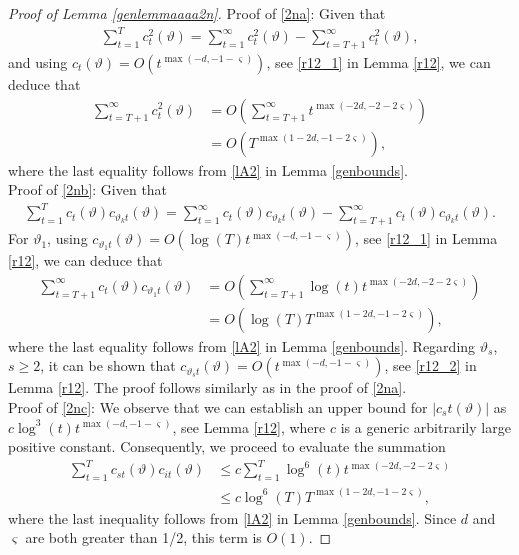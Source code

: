 {{\begin{lemma}
\end{lemma}
\begin{proof}[Proof of Lemma \ref{genlemmaaaa2n}]
Proof of \eqref{2na}: Given that 
\begin{align*}
     \sum_{t = 1}^T c^2_{t}(\vartheta) =  \sum_{t = 1}^{\infty} c^2_{t}(\vartheta) - \sum_{t = T+1}^{\infty} c^2_{t}(\vartheta),
\end{align*}
and using $c_t(\vartheta)  = O(t^{\max(-d,-1-\varsigma)})$, see \eqref{r12_1} in Lemma \ref{r12}, we can deduce that 
\begin{align*}
    \sum_{t = T+1}^{\infty} c^2_{t}(\vartheta) &= O\left(\sum_{t = T+1}^{\infty} t^{\max(-2d,-2-2\varsigma)} \right) \\
    &=  O\left(T^{\max(1-2d,-1-2\varsigma)}\right),
\end{align*}
where the last equality follows from \eqref{lA2} in Lemma \ref{genbounds}. \\
Proof of \eqref{2nb}: Given that
\begin{align*}
    \sum_{t = 1}^T c_{t}(\vartheta) c_{\vartheta_k t}(\vartheta)  = \sum_{t = 1}^{\infty} c_{t}(\vartheta) c_{\vartheta_k t}(\vartheta) - \sum_{t = T+1}^{\infty} c_{t}(\vartheta) c_{\vartheta_k t}(\vartheta). 
\end{align*}
For $\vartheta_1$, using $c_{\vartheta_1 t}(\vartheta)  = O(\log(T) t^{\max(-d,-1-\varsigma)})$, see \eqref{r12_1} in Lemma \ref{r12}, we can deduce that
\begin{align*}
    \sum_{t = T+1}^{\infty} c_{t}(\vartheta) c_{\vartheta_1 t}(\vartheta) &= O\left( \sum_{t = T+1}^{\infty} \log(t) t^{\max(-2d,-2-2\varsigma)} \right) \\
    &= O\left( \log(T) T^{\max(1-2d,-1-2\varsigma)} \right),
\end{align*}
where the last equality follows from \eqref{lA2} in Lemma \ref{genbounds}.
Regarding $\vartheta_s$, $s \geq 2$, it can be shown that $c_{\vartheta_s t}(\vartheta)  = O(t^{\max(-d,-1-\varsigma)})$, see \eqref{r12_2} in Lemma \ref{r12}. The proof follows similarly as in the proof of \eqref{2na}.\\
Proof of \eqref{2nc}: We observe that we can establish an upper bound for $|c_st(\vartheta)|$ as $c \log^3(t) t^{\max(-d,-1-\varsigma)}$, see Lemma \ref{r12}, where $c$ is a generic
arbitrarily large positive constant. Consequently, we proceed to evaluate the summation 
\begin{align*}
     \sum_{t = 1}^T c_{s t}(\vartheta) c_{i t}(\vartheta) &\leq c \sum_{t = 1}^T \log^6(t) t^{\max(-2d,-2-2\varsigma)} \\
     &\leq c \log^6(T) T^{\max(1-2d,-1-2\varsigma)},  
\end{align*}
where the last inequality follows from \eqref{lA2} in Lemma \ref{genbounds}. Since $d$ and $\varsigma$ are both greater than 1/2, this term is $O(1)$.


\end{proof}}}

